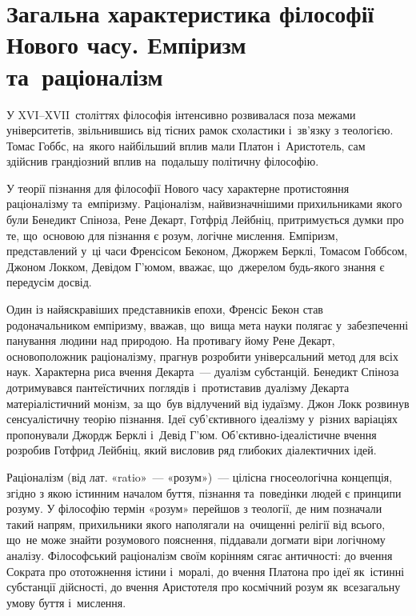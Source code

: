 \documentclass[a5paper,oneside,DIV=12,12pt,headings=small]{scrartcl}
\begin{document}
	\section{Загальна характеристика філософії Нового часу. Емпіризм та~раціоналізм}
		У XVI–XVII~століттях філософія інтенсивно розвивалася поза межами університетів, звільнившись від тісних рамок схоластики і~зв'язку з теологією. Томас Гоббс, на~якого найбільший вплив мали Платон і~Аристотель, сам здійснив грандіозний вплив на~подальшу політичну філософію.
	
		У теорії пізнання для філософії Нового часу характерне протистояння раціоналізму та~емпіризму. Раціоналізм, найвизначнішими прихильниками якого були Бенедикт Спіноза, Рене Декарт, Готфрід Лейбніц, притримується думки про те, що~основою для пізнання є розум, логічне мислення. Емпіризм, представлений у~ці часи Френсісом Беконом, Джоржем Берклі, Томасом Гоббсом, Джоном Локком, Девідом Г'юмом, вважає, що~джерелом будь-якого знання є передусім досвід.
		
		Один із найяскравіших представників епохи, Френсіс Бекон став родоначальником емпіризму, вважав, що~вища мета науки полягає у~забезпеченні панування людини над природою. На противагу йому Рене Декарт, основоположник раціоналізму, прагнув розробити універсальний метод для всіх наук. Характерна риса вчення Декарта~— дуалізм субстанцій. Бенедикт Спіноза дотримувався пантеїстичних поглядів і~протиставив дуалізму Декарта матеріалістичний монізм, за що~був відлучений від іудаїзму. Джон Локк розвинув сенсуалістичну теорію пізнання. Ідеї суб'єктивного ідеалізму у~різних варіаціях пропонували Джордж Берклі і~Девід Г'юм. Об'\-єк\-тив\-но-іде\-ал\-і\-стич\-не вчення розробив Готфрид Лейбніц, який висловив ряд глибоких діалектичних ідей.
		
		Раціоналізм (від лат. «ratio»~— «розум»)~— цілісна гносеологічна концепція, згідно з якою істинним началом буття, пізнання та~поведінки людей є принципи розуму. У філософію термін «розум» перейшов з теології, де ним позначали такий напрям, прихильники якого наполягали на~очищенні релігії від всього, що~не може знайти розумового пояснення, піддавали догмати віри логічному аналізу. Філософський раціоналізм своїм корінням сягає античності: до вчення Сократа про ототожнення істини і~моралі, до вчення Платона про ідеї як~істинні субстанції дійсності, до вчення Аристотеля про космічний розум як~всезагальну умову буття і~мислення.
		
\end{document}
